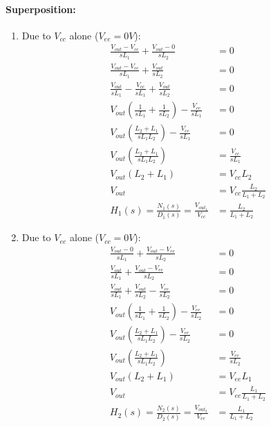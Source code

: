 \paragraph{Superposition:}
\begin{enumerate}
  \item Due to \(V_{cc}\) alone (\(V_{ee} = 0V\)):
    \begin{align*}
      \frac{V_{out} - V_{cc}}{sL_1} + \frac{V_{out} - 0}{sL_2} &= 0 \\
      \frac{V_{out} - V_{cc}}{sL_1} + \frac{V_{out}}{sL_2} &= 0 \\
      \frac{V_{out}}{sL_1} - \frac{V_{cc}}{sL_1} + \frac{V_{out}}{sL_2} &= 0 \\
      V_{out}\left(\frac{1}{sL_1} + \frac{1}{sL_2}\right) - \frac{V_{cc}}{sL_1} &= 0 \\
      V_{out}\left(\frac{L_2 + L_1}{sL_1 L_2}\right) - \frac{V_{cc}}{sL_1} &= 0 \\
      V_{out}\left(\frac{L_2 + L_1}{sL_1 L_2}\right) &= \frac{V_{cc}}{sL_1} \\
      V_{out}(L_2 + L_1) &= V_{cc} L_2 \\
      V_{out} &= V_{cc} \frac{L_2}{L_1 + L_2} \\
      H_1(s) = \frac{N_1(s)}{D_1(s)} = \frac{V_{out_1}}{V_{cc}} &= \frac{L_2}{L_1 + L_2}
    \end{align*}
  \item Due to \(V_{ee}\) alone (\(V_{cc} = 0V\)):
    \begin{align*}
      \frac{V_{out} - 0}{sL_1} + \frac{V_{out} - V_{ee}}{sL_2} &= 0 \\
      \frac{V_{out}}{sL_1} + \frac{V_{out} - V_{ee}}{sL_2} &= 0 \\
      \frac{V_{out}}{sL_1} + \frac{V_{out}}{sL_2} - \frac{V_{ee}}{sL_2} &= 0 \\
      V_{out}\left(\frac{1}{sL_1} + \frac{1}{sL_2}\right) - \frac{V_{ee}}{sL_2} &= 0 \\
      V_{out}\left(\frac{L_2 + L_1}{sL_1 L_2}\right) - \frac{V_{ee}}{sL_2} &= 0 \\
      V_{out}\left(\frac{L_2 + L_1}{sL_1 L_2}\right) &= \frac{V_{ee}}{sL_2} \\
      V_{out}(L_2 + L_1) &= V_{ee} L_1 \\
      V_{out} &= V_{ee} \frac{L_1}{L_1 + L_2} \\
      H_2(s) = \frac{N_2(s)}{D_2(s)} = \frac{V_{out_2}}{V_{ee}} &= \frac{L_1}{L_1 + L_2}
    \end{align*}
\end{enumerate}
